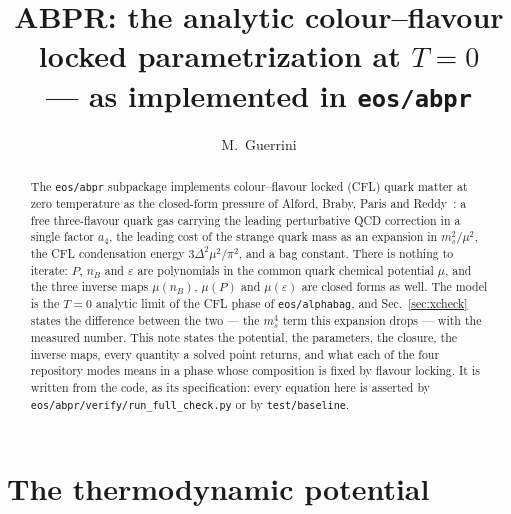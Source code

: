 \documentclass[aps,prc,onecolumn,superscriptaddress,nofootinbib,10pt]{revtex4-2}
\newcommand{\nB}{n_B}
\newcommand{\ms}{m_s}
\begin{document}
\title{ABPR: the analytic colour--flavour locked parametrization at $T = 0$ \\
       --- as implemented in \texttt{eos/abpr}}

\author{M.~Guerrini}

\begin{abstract}
The \texttt{eos/abpr} subpackage implements colour--flavour locked (CFL) quark
matter at zero temperature as the closed-form pressure of Alford, Braby, Paris
and Reddy~\cite{AlfordBrabyParisReddy2005}: a free three-flavour quark gas
carrying the leading perturbative QCD correction in a single factor $a_4$, the
leading cost of the strange quark mass as an expansion in $\ms^2/\mu^2$, the
CFL condensation energy $3\Delta^2\mu^2/\pi^2$, and a bag constant. There is
nothing to iterate: $P$, $\nB$ and $\varepsilon$ are polynomials in the common
quark chemical potential $\mu$, and the three inverse maps
$\mu(\nB)$, $\mu(P)$ and $\mu(\varepsilon)$ are closed forms as well. The
model is the $T = 0$ analytic limit of the CFL phase of
\texttt{eos/alphabag}, and Sec.~\ref{sec:xcheck} states the difference between
the two --- the $\ms^4$ term this expansion drops --- with the measured
number. This note states the potential, the parameters, the closure, the
inverse maps, every quantity a solved point returns, and what each of the
four repository modes means in a phase whose composition is fixed by flavour
locking. It is written from the code, as its specification: every equation
here is asserted by \texttt{eos/abpr/verify/run\_full\_check.py} or by
\texttt{test/baseline}.
\end{abstract}

\maketitle

\section{The thermodynamic potential}
\label{sec:potential}
\end{document}
